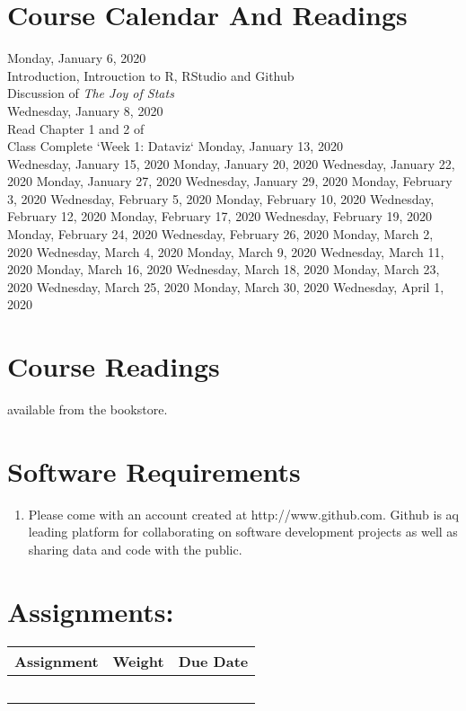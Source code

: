 \documentclass{article}
\begin{document}
\section*{Course Calendar And Readings}
Monday, January 6, 2020\\
Introduction, Introuction to R, RStudio and Github\\
Discussion of \emph{The Joy of Stats}\\
Wednesday, January 8, 2020\\
Read Chapter 1 and 2 of \cite{healy_data_2018}\\
Class Complete `Week 1: Dataviz`
Monday, January 13, 2020\\

Wednesday, January 15, 2020
Monday, January 20, 2020
Wednesday, January 22, 2020
Monday, January 27, 2020
Wednesday, January 29, 2020
Monday, February 3, 2020
Wednesday, February 5, 2020
Monday, February 10, 2020
Wednesday, February 12, 2020
Monday, February 17, 2020
Wednesday, February 19, 2020
Monday, February 24, 2020
Wednesday, February 26, 2020
Monday, March 2, 2020
Wednesday, March 4, 2020
Monday, March 9, 2020
Wednesday, March 11, 2020
Monday, March 16, 2020
Wednesday, March 18, 2020
Monday, March 23, 2020
Wednesday, March 25, 2020
Monday, March 30, 2020
Wednesday, April 1, 2020


\section*{Course Readings}
available from the bookstore. 
\section*{Software Requirements}
\begin{enumerate}
\item Please come with an account created at http://www.github.com. Github is aq leading platform for collaborating on software development projects as well as sharing data and code with the public.  

\end{enumerate}

\section*{Assignments:}
\begin{table}[ht]
\center
\begin{tabular}{lrr}
Assignment & Weight & Due Date\\
\hline
&	&\\
&			&\\
	&		&		\\
&  &\\
& & \\

\end{tabular}
\end{table}
\end{document}
